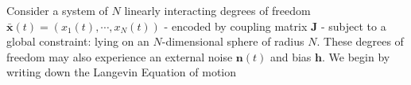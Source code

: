 Consider a system of $N$ linearly interacting degrees of freedom $\mathbf{\bar x}(t) = (x_1(t),\cdots, x_N(t))$ - encoded by coupling matrix $\mathbf{J}$ - subject to a global constraint: lying on an $N$-dimensional sphere of radius $N$. These degrees of freedom may also experience an external noise $\mathbf{n}(t)$ and bias $\mathbf{h}$. We begin by writing down the Langevin Equation of motion